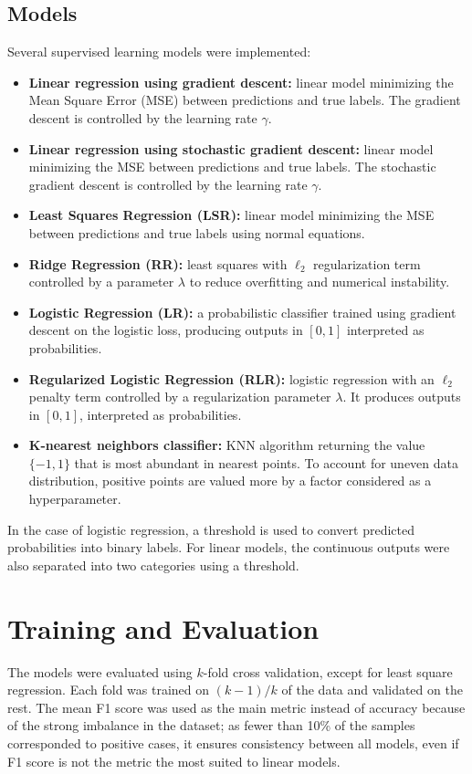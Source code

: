\documentclass[10pt,conference,compsocconf]{IEEEtran}
\begin{document}
\subsection{Models}
Several supervised learning models were implemented:
\begin{itemize}
    \item \textbf{Linear regression using gradient descent:} linear model minimizing the Mean Square Error (MSE) between predictions and true labels. The gradient descent is controlled by the learning rate $\gamma$.
    \item \textbf{Linear regression using stochastic gradient descent:} linear model minimizing the MSE between predictions and true labels. The stochastic gradient descent is controlled by the learning rate $\gamma$.
    \item \textbf{Least Squares Regression (LSR):} linear model minimizing the MSE between predictions and true labels using normal equations.
    \item \textbf{Ridge Regression (RR):} least squares with $\ell_2$ regularization term controlled by a parameter $\lambda$ to reduce overfitting and numerical instability. 
    \item \textbf{Logistic Regression (LR):} a probabilistic classifier trained using gradient descent on the logistic loss, producing outputs in $[0,1]$ interpreted as probabilities. 
    \item \textbf{Regularized Logistic Regression (RLR):} logistic regression with an $\ell_2$ penalty term controlled by a regularization parameter $\lambda$. It produces outputs in $[0,1]$, interpreted as probabilities. 
    \item \textbf{K-nearest neighbors classifier:} KNN algorithm returning the value $\{-1, 1\}$ that is most abundant in nearest points. To account for uneven data distribution, positive points are valued more by a factor considered as a hyperparameter.
\end{itemize}
In the case of logistic regression, a threshold is used to convert predicted probabilities into binary labels. For linear models, the continuous outputs were also separated into two categories using a threshold. 


\section{Training and Evaluation}
\label{sec:training-evaluation}
The models were evaluated using $k$-fold cross validation, except for least square regression. Each fold was trained on $(k-1) / k$ of the data and validated on the rest. The mean F1 score was used as the main metric instead of accuracy because of the strong imbalance in the dataset; as fewer than 10\% of the samples corresponded to positive cases, it ensures consistency between all models, even if F1 score is not the metric the most suited to linear models. 
\end{document}
